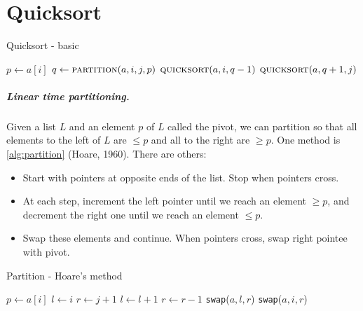 \chapter{Quicksort} %
\label{sec:quicksort}

\begin{algorithm}[H]
  \caption{Quicksort - basic}    
  \label{alg:quicksort}
\begin{algorithmic}[0]
			\State $p \gets a[i]$ 
			\State $q \gets  \Call{partition}{a, i,j,p}$ 
			\State $\Call{quicksort}{a,i,q-1}$ 
			\State $\Call{quicksort}{a,q+1,j}$ 
			
		\EndIf
	\EndFunction  
\end{algorithmic}
\end{algorithm}

\paragraph{Linear time partitioning.}
Given a list $L$ and an element $p$ of $L$ called the pivot, we can partition so
 that all elements to the left of $L$ are $\leq p$ and all to the right are 
$\geq p$. One method is \cref{alg:partition} (Hoare, 1960). There are others:
\begin{itemize}
\item Start with pointers at opposite ends of the list. Stop when pointers cross.
\item At each step, increment the left pointer until we reach an element $\geq p$, and decrement the right one until we reach an element $\leq p$. 
\item Swap these elements and continue. When pointers cross, swap right pointee with pivot.
\end{itemize}

\begin{algorithm}[H]
  \caption{Partition - Hoare's method}
    \label{alg:partition}
\begin{algorithmic}[0]
\State $p \gets a[i]$ 
\State $l \gets i $ 
\State $r \gets j+1$ 
\Repeat
\State $l\gets l+1 $ 
\Repeat
\State $r \gets r-1 $ 
\State \texttt{swap}($a,l,r$)  
\Else
\State \texttt{swap}($a,i,r$)  
\State {}
\EndIf
\EndWhile
\EndFunction  
\end{algorithmic}
\end{algorithm}

